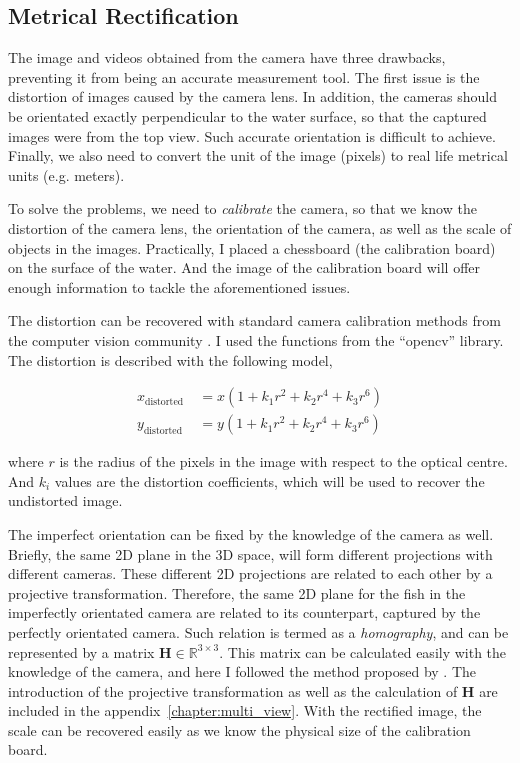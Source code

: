 \documentclass[11pt,twoside]{report}
\begin{document}
\subsection{Metrical Rectification}
\label{section:metric_rectify}


The image and videos obtained from the camera have three drawbacks, preventing it from being an accurate measurement tool.
The first issue is the distortion of images caused by the camera lens.
In addition, the cameras should be orientated exactly perpendicular to the water surface, so that the captured images were from the top view. Such accurate orientation is difficult to achieve.
Finally, we also need to convert the unit of the image (pixels) to real life metrical units (e.g. meters).

To solve the problems, we need to \emph{calibrate} the camera, so that we know the distortion of the camera lens, the orientation of the camera, as well as the scale of objects in the images. Practically, I placed a chessboard (the calibration board) on the surface of the water. And the image of the calibration board will offer enough information to tackle the aforementioned issues. 

The distortion can be recovered with standard camera calibration methods from the computer vision community \cite{ma2005, hartley2003}. I used the functions from the ``opencv'' library. The distortion is described with the following model,

$$
\begin{aligned}
x_{\text {distorted }} &= x\left(1+k_{1} r^{2}+k_{2} r^{4}+k_{3} r^{6}\right) \\
y_{\text {distorted }} &= y\left(1+k_{1} r^{2}+k_{2} r^{4}+k_{3} r^{6}\right)
\end{aligned}
$$

\noindent where $r$ is the radius of the pixels in the image with respect to the optical centre. And $k_i$ values are the distortion coefficients, which will be used to recover the undistorted image.


The imperfect orientation can be fixed by the knowledge of the camera as well. Briefly, the same 2D plane in the 3D space, will form different projections with different cameras. These different 2D projections are related to each other by a projective transformation. Therefore, the same 2D plane for the fish in the imperfectly orientated camera are related to its counterpart, captured by the perfectly orientated camera. Such relation is termed as a \emph{homography}, and can be represented by a matrix
$\mathbf{H} \in \mathbb{R}^{3 \times 3}$. This matrix can be calculated easily with the knowledge of the camera, and here I followed the method proposed by \citeauthor{hartley2003} \cite{hartley2003}. The introduction of the projective transformation as well as the calculation of $\mathbf{H}$ are included in the appendix~\ref{chapter:multi_view}. With the rectified image, the scale can be recovered easily as we know the physical size of the calibration board.
\end{document}
